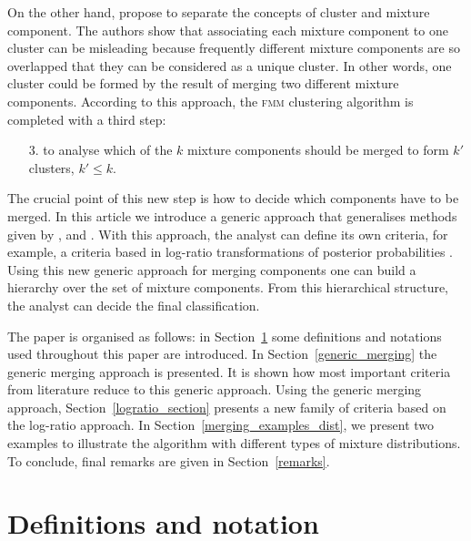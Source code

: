 \documentclass[submit]{smj}
\theoremstyle{definition}
\newcommand{\fmm}{\textsc{fmm}\xspace}
\begin{document}
On the other hand, \cite{lee2004combining,hennig2010methods,baudry2010combining,melnykov2013distribution,pastore2013merging} propose to separate the concepts of cluster and mixture component. The authors show that associating each mixture component to one cluster can be misleading because frequently different mixture components are so overlapped that they can be considered as a unique cluster. In other words, one cluster could be formed by the result of merging two different mixture components. According to this approach, the \fmm clustering algorithm is completed with a third step:

\begin{itemize}
\item[3.] to analyse which of the $k$ mixture components should be merged to form $k'$ clusters, $k' \leq k$.
\end{itemize}

The crucial point of this new step is how to decide which components have to be merged. In this article we introduce a generic approach that generalises methods given by \cite{baudry2010combining}, \cite{hennig2010methods} and \cite{longford2014}. With this approach, the analyst can define its own criteria, for example, a criteria based in log-ratio transformations of posterior probabilities \citep{aitchison1986statistical}. Using this new generic approach for merging components one can build a hierarchy over the set of mixture components. From this hierarchical structure, the analyst can decide the final classification.

The paper is organised as follows: in Section~\ref{definitions} some definitions and notations used throughout this paper are introduced. In Section~\ref{generic_merging} the generic merging approach is presented. It is shown how most important criteria from literature reduce to this generic approach. Using the generic merging approach, Section~\ref{logratio_section} presents a new family of criteria based on the log-ratio approach. In Section~\ref{merging_examples_dist}, we present two examples to illustrate the algorithm with different types of mixture distributions. To conclude, final remarks are given in Section~\ref{remarks}.

\section{Definitions and notation}\label{definitions}
\end{document}
